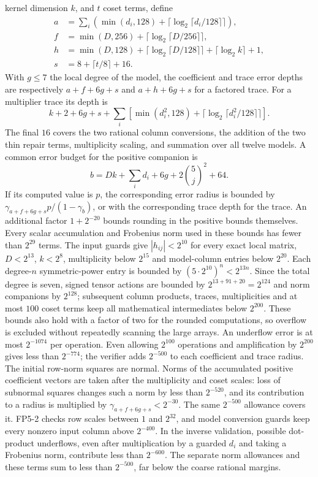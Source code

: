 kernel dimension $k$, and $t$ coset terms, define
\begin{align*}
 a&=\sum_i\left(\min(d_i,128)+\lceil\log_2\lceil d_i/128\rceil\rceil\right),\\
 f&=\min(D,256)+\lceil\log_2\lceil D/256\rceil\rceil,\\
 h&=\min(D,128)+\lceil\log_2\lceil D/128\rceil\rceil+\lceil\log_2 k\rceil+1,\\
 s&=8+\lceil t/8\rceil+16.
\end{align*}
With $g\le7$ the local degree of the model, the coefficient and trace error depths are respectively $a+f+6g+s$
and $a+h+6g+s$ for a factored trace. For a multiplier trace its depth is
\[
 k+2+6g+s+
 \sum_i\left[\min(d_i^2,128)+\lceil\log_2\lceil d_i^2/128\rceil\rceil\right].
\]
The final $16$ covers the two rational column conversions,
the addition of the two thin repair terms, multiplicity scaling,
and summation over all twelve models. A common error budget for the
positive companion is
\[
 b=Dk+\sum_i d_i+6g+2\binom5j^2+64.
\]
If its computed value is $p$, the corresponding error radius is bounded
by $\gamma_{a+f+6g+s}p/(1-\gamma_b)$, or with the corresponding trace
depth for the trace. An additional factor $1+2^{-20}$ bounds rounding in the positive
bounds themselves. Every scalar accumulation and Frobenius norm used in these bounds has
fewer than $2^{29}$ terms. The input guards give $|h_{ij}|<2^{10}$ for
every exact local matrix, $D<2^{13}$, $k<2^8$, multiplicity below $2^{15}$
and model-column entries below $2^{20}$. Each degree-$n$ symmetric-power
entry is bounded by $(5\cdot2^{10})^n<2^{13n}$. Since the total degree is
seven, signed tensor actions are bounded by $2^{13+91+20}=2^{124}$ and
norm companions by $2^{128}$; subsequent
column products, traces, multiplicities and at most $100$ coset terms keep
all mathematical intermediates below $2^{200}$. These bounds also hold
with a factor of two for the rounded computations, so overflow is
excluded without repeatedly scanning the large arrays. An underflow
error is at most $2^{-1074}$ per operation. Even allowing $2^{100}$
operations and amplification by $2^{200}$ gives less than $2^{-774}$;
the verifier adds $2^{-500}$ to each coefficient and trace radius.
The initial row-norm squares are normal. Norms of the accumulated
positive coefficient vectors are taken after the multiplicity and coset
scales: loss of subnormal squares changes such a norm by less than
$2^{-520}$, and its contribution to a radius is multiplied by
$\gamma_{a+f+6g+s}<2^{-30}$. The same $2^{-500}$ allowance covers it.
FP5-2 checks row scales between $1$ and $2^{32}$, and model conversion
guards keep every nonzero input column above $2^{-400}$.
In the inverse validation, possible dot-product underflows, even after
multiplication by a guarded $d_i$ and taking a Frobenius norm, contribute
less than $2^{-600}$. The separate norm allowances and these terms sum
to less than $2^{-500}$, far below the coarse rational margins.

